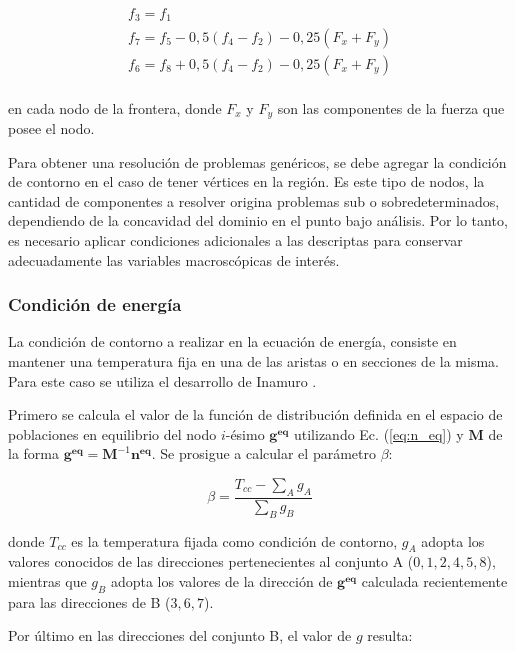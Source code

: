 \begin{equation}
\begin{array}{c}
f_{3} = f_{1}\\
f_{7} = f_{5} - 0,5 (f_{4} - f_{2}) - 0,25 (F_{x} + F_{y})\\
f_{6} = f_{8} + 0,5 (f_{4} - f_{2}) - 0,25 (F_{x} + F_{y})\\
\end{array}
\end{equation}

en cada nodo de la frontera, donde $F_{x}$ y  $F_{y}$ son las componentes de la fuerza que posee el nodo. 

Para obtener una resolución de problemas genéricos, se debe agregar la condición de contorno en el caso de tener vértices en la región. Es este tipo de nodos, la cantidad de componentes a resolver origina problemas sub o sobredeterminados, dependiendo de la concavidad del dominio en el punto bajo análisis. Por lo tanto, es necesario aplicar condiciones adicionales a las descriptas para conservar adecuadamente las variables macroscópicas de interés.

\subsubsection{Condición de energía}

La condición de contorno a realizar en la ecuación de energía, consiste en mantener una temperatura fija en una de las aristas o en secciones de la misma. Para este caso se utiliza el desarrollo de Inamuro \cite{inamuro2002lattice}.

Primero se calcula el valor de la función de distribución definida en el espacio de poblaciones en equilibrio del nodo $i$-ésimo $\mathbf{g^{eq}}$ utilizando Ec. (\ref{eq:n_eq}) y $\mathbf{M}$ de la forma $\mathbf{g^{eq}} = \mathbf{M}^{-1} \mathbf{n^{eq}}$. Se prosigue a calcular el parámetro $\beta$:

\begin{equation}
\beta = \frac{T_{cc} - \sum_{A} g_{A}}{\sum_{B} g_{B}}
\label{eq:beta}
\end{equation}

donde $T_{cc}$ es la temperatura fijada como condición de contorno, $g_{A}$ adopta los valores conocidos de las direcciones pertenecientes al conjunto A ($0, 1, 2, 4, 5, 8 $), mientras que $g_{B}$ adopta los valores de la dirección de $\mathbf{g^{eq}}$ calculada recientemente para las direcciones de B ($3, 6, 7$).

Por último en las direcciones del conjunto B, el valor de $g$ resulta:

